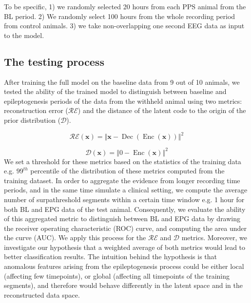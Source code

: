 \documentclass[pmlr]{jmlr}%
\begin{document}
To be specific, 1) we randomly selected 20 hours from each PPS animal from the BL period. 2) We randomly select 100 hours from the whole recording period from control animals. 3) we take non-overlapping one second EEG data as input to the model.



\subsection{The testing process}
After training the full model on the baseline data from 9 out of 10 animals, we tested the ability of the trained model to distinguish between baseline and epileptogenesis periods of the data from the withheld animal using two metrics: reconstruction error ($\mathcal{RE}$) and the distance of the latent code to the origin of the prior distribution ($\mathcal{D}$). 

\begin{equation}
\mathcal{RE(\mathbf{x})}= \left\Vert \mathbf{x} - \operatorname{Dec}(\operatorname{Enc}(\mathbf{x})) \right\Vert^2 
\end{equation}

\begin{equation}
\mathcal{D}(\mathbf{x})= \left\Vert 0 - \operatorname{Enc}(\mathbf{x}) \right\Vert^2
\end{equation}
We set a threshold for these metrics based on the statistics of the training data e.g. $99^{th}$ percentile of the distribution of these metrics computed from the training dataset. In order to aggregate the evidence from longer recording time periods, and in the same time simulate a clinical setting, we compute the average number of surpathreshold segments within a certain time window e.g. 1 hour for both BL and EPG data of the test animal. Consequently, we evaluate the ability of this aggregated metric to distinguish between BL and EPG data by drawing the receiver operating characteristic (ROC) curve, and computing the area under the curve (AUC). We apply this process for the $\mathcal{RE}$ and $\mathcal{D}$ metrics. Moreover, we investigate our hypothesis that a weighted average of both metrics would lead to better classification results. The intuition behind the hypothesis is that anomalous features arising from the epileptogenesis process could be either local (affecting few timepoints), or global (affecting all timepoints of the training segments), and therefore would behave differently in the latent space and in the reconstructed data space.
\end{document}
